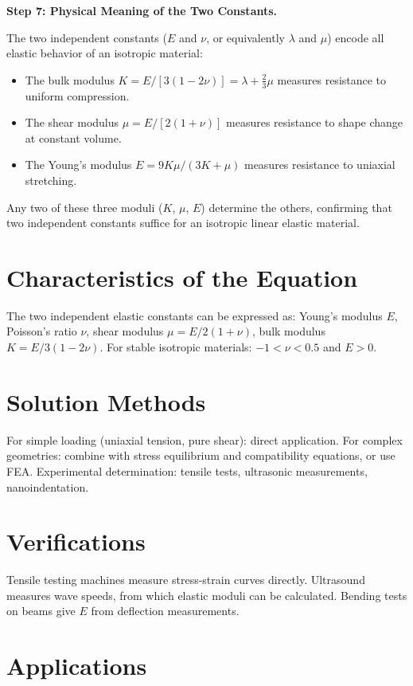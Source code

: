 \textbf{Step 7: Physical Meaning of the Two Constants.}

The two independent constants ($E$ and $\nu$, or equivalently $\lambda$ and $\mu$) encode all elastic behavior of an isotropic material:

\begin{itemize}
\item The bulk modulus $K = E/[3(1-2\nu)] = \lambda + \frac{2}{3}\mu$ measures resistance to uniform compression.
\item The shear modulus $\mu = E/[2(1+\nu)]$ measures resistance to shape change at constant volume.
\item The Young's modulus $E = 9K\mu/(3K + \mu)$ measures resistance to uniaxial stretching.
\end{itemize}

Any two of these three moduli ($K$, $\mu$, $E$) determine the others, confirming that two independent constants suffice for an isotropic linear elastic material.

\section*{Characteristics of the Equation}

The two independent elastic constants can be expressed as: Young's modulus $E$, Poisson's ratio $\nu$, shear modulus $\mu = E/2(1+\nu)$, bulk modulus $K = E/3(1-2\nu)$. For stable isotropic materials: $-1 < \nu < 0.5$ and $E > 0$.
\section*{Solution Methods}

For simple loading (uniaxial tension, pure shear): direct application. For complex geometries: combine with stress equilibrium and compatibility equations, or use FEA. Experimental determination: tensile tests, ultrasonic measurements, nanoindentation.
\section*{Verifications}

Tensile testing machines measure stress-strain curves directly. Ultrasound measures wave speeds, from which elastic moduli can be calculated. Bending tests on beams give $E$ from deflection measurements.
\section*{Applications}

